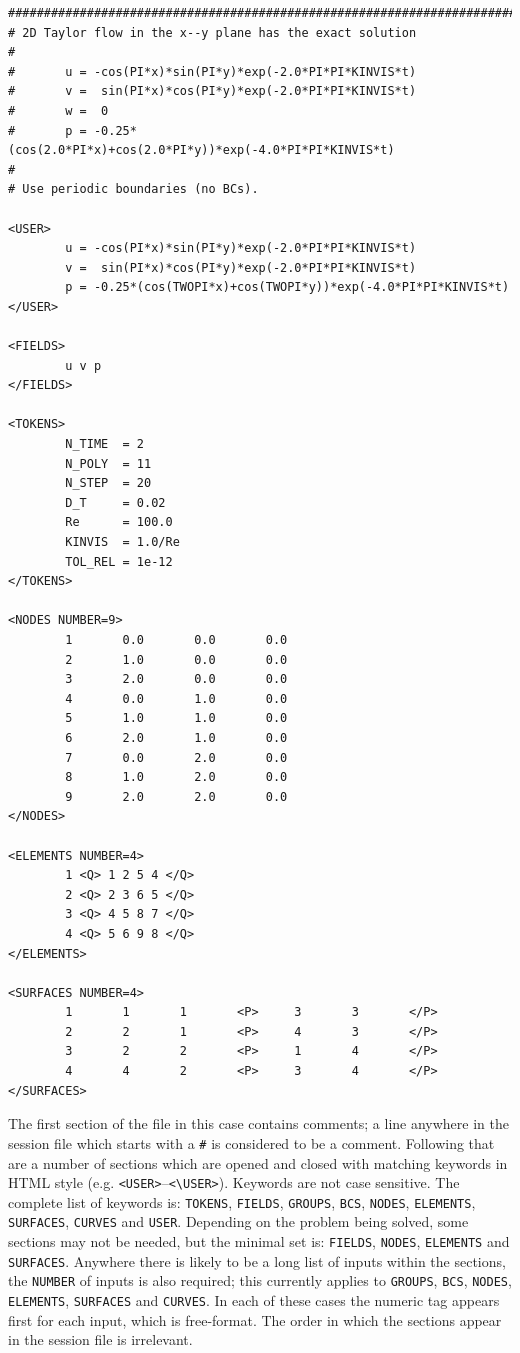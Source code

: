 \documentclass[11pt,a4paper]{report}
\begin{document}
{\small
\begin{verbatim}
##############################################################################
# 2D Taylor flow in the x--y plane has the exact solution
#
#       u = -cos(PI*x)*sin(PI*y)*exp(-2.0*PI*PI*KINVIS*t)
#       v =  sin(PI*x)*cos(PI*y)*exp(-2.0*PI*PI*KINVIS*t)
#       w =  0
#       p = -0.25*(cos(2.0*PI*x)+cos(2.0*PI*y))*exp(-4.0*PI*PI*KINVIS*t)
#
# Use periodic boundaries (no BCs).

<USER>
        u = -cos(PI*x)*sin(PI*y)*exp(-2.0*PI*PI*KINVIS*t)
        v =  sin(PI*x)*cos(PI*y)*exp(-2.0*PI*PI*KINVIS*t)
        p = -0.25*(cos(TWOPI*x)+cos(TWOPI*y))*exp(-4.0*PI*PI*KINVIS*t)
</USER>

<FIELDS>
        u v p
</FIELDS>

<TOKENS>
        N_TIME  = 2
        N_POLY  = 11
        N_STEP  = 20
        D_T     = 0.02
        Re      = 100.0
        KINVIS  = 1.0/Re
        TOL_REL = 1e-12
</TOKENS>

<NODES NUMBER=9>
        1       0.0       0.0       0.0
        2       1.0       0.0       0.0
        3       2.0       0.0       0.0
        4       0.0       1.0       0.0
        5       1.0       1.0       0.0
        6       2.0       1.0       0.0
        7       0.0       2.0       0.0
        8       1.0       2.0       0.0
        9       2.0       2.0       0.0
</NODES>

<ELEMENTS NUMBER=4>
        1 <Q> 1 2 5 4 </Q>
        2 <Q> 2 3 6 5 </Q>
        3 <Q> 4 5 8 7 </Q>
        4 <Q> 5 6 9 8 </Q>
</ELEMENTS>

<SURFACES NUMBER=4>
        1       1       1       <P>     3       3       </P>
        2       2       1       <P>     4       3       </P>
        3       2       2       <P>     1       4       </P>
        4       4       2       <P>     3       4       </P>
</SURFACES>
\end{verbatim}
}

The first section of the file in this case contains comments; a line
anywhere in the session file which starts with a \verb+#+ is
considered to be a comment.  Following that are a number of sections
which are opened and closed with matching keywords in HTML style (e.g.
\verb+<USER>+--\verb+<\USER>+).  Keywords are not case sensitive.
The complete list of keywords is: \texttt{TOKENS}, \texttt{FIELDS}, 
\texttt{GROUPS}, \texttt{BCS}, \texttt{NODES}, \texttt{ELEMENTS}, 
\texttt{SURFACES}, \texttt{CURVES} and \texttt{USER}.  Depending on the
problem being solved, some sections may not be needed, but the minimal
set is: \texttt{FIELDS}, \texttt{NODES}, \texttt{ELEMENTS} and
\texttt{SURFACES}.  Anywhere there is likely to be a long list of
inputs within the sections, the \texttt{NUMBER} of inputs is also
required; this currently applies to \texttt{GROUPS}, \texttt{BCS},
\texttt{NODES}, \texttt{ELEMENTS}, \texttt{SURFACES} and
\texttt{CURVES}.  In each of these cases the numeric tag appears first for
each input, which is free-format.  The order in which the sections
appear in the session file is irrelevant.
\end{document}
